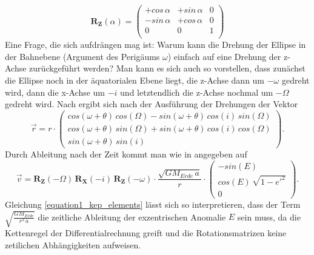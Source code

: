 \begin{equation}
\mathbf{R_Z}(\alpha) = 
	\left(
		\begin{array}{ccc}
			+cos\,\alpha & +sin\,\alpha & 0\\
			-sin\,\alpha & +cos\,\alpha & 0\\
			0 & 0 & 1 \\
		\end{array}
	\right)
\end{equation}
Eine Frage, die sich aufdrängen mag ist: Warum kann die Drehung der Ellipse in der Bahnebene (Argument des Perigäums \ensuremath{\omega}) einfach auf eine Drehung der z-Achse zurückgeführt werden? Man kann es sich auch so vorstellen, dass zunächst die Ellipse noch in der äquatorialen Ebene liegt, die z-Achse dann um \ensuremath{-\omega} gedreht wird, dann die x-Achse um \ensuremath{-i} und letztendlich die z-Achse nochmal um \ensuremath{-\Omega} gedreht wird.
\newpar
Nach \cite{HandRaum} ergibt sich nach der Ausführung der Drehungen der Vektor
\begin{equation}
\vec{r} = r\cdot  
	\left(
		\begin{array}{c}
				cos(\omega+\theta)\,cos(\Omega)-sin(\omega+\theta)\,cos(i)\,sin(\Omega)\\
				cos(\omega+\theta)\,sin(\Omega)+sin(\omega+\theta)\,cos(i)\,cos(\Omega)\\
				sin(\omega+\theta)\,sin(i)				
		\end{array}
	\right).
	\label{equation1_kep_elements}
\end{equation}
Durch Ableitung nach der Zeit kommt man wie in \cite{HandRaum} angegeben auf
\begin{equation}
	\vec{v}=\mathbf{R_Z}(-\Omega)\,\mathbf{R_X}(-i)\,\mathbf{R_Z}(-\omega)\cdot\frac{\sqrt{GM_{Erde}\,a}}{r}\cdot\left(\begin{array}{c}-sin(E)\\ cos(E)\,\sqrt{1-e'^2} \\0\end{array}\right).
	\label{equation2_kep_elements}
\end{equation} 
Gleichung \ref{equation1_kep_elements} lässt sich so interpretieren, dass der Term \ensuremath{\sqrt{\frac{GM_{Erde}}{r^2\,a}}} die zeitliche Ableitung der exzentrischen Anomalie \ensuremath{E} sein muss, da die Kettenregel der Differentialrechnung greift und die Rotationsmatrizen keine zetilichen Abhängigkeiten aufweisen.
\newpar
